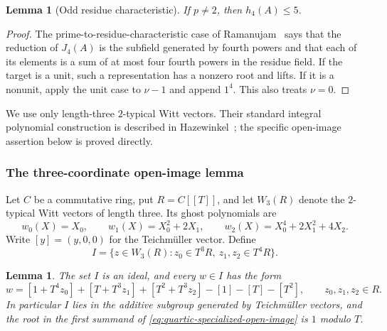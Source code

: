 \documentclass[11pt]{amsart}
\newtheorem{lemma}[theorem]{Lemma}
\theoremstyle{definition}
\numberwithin{equation}{section}
\begin{document}
\begin{lemma}[Odd residue characteristic]\label{lem:odd-local}
If $p\ne2$, then $h_4(A)\le5$.
\end{lemma}
\begin{proof}
The prime-to-residue-characteristic case of
Ramanujam~\cite[Lemma~1]{Ramanujam1963} says that the reduction of
$J_4(A)$ is the subfield generated by fourth powers and that each
of its elements is a sum of at most four fourth powers in the
residue field. If the target is a unit, such a representation has
a nonzero root and lifts. If it is a nonunit, apply the unit case
to $\nu-1$ and append $1^4$. This also treats $\nu=0$.
\end{proof}

We use only length-three $2$-typical Witt vectors. Their standard
integral polynomial construction is described in
Hazewinkel~\cite[Sections~5.2--5.22]{hazewinkel2009}; the specific
open-image assertion below is proved directly.
\subsubsection{The three-coordinate open-image lemma}

Let $C$ be a commutative ring, put $R=C[[T]]$, and let $W_3(R)$ denote
the $2$-typical Witt vectors of length three.  Its ghost polynomials are
\[
 w_0(X)=X_0,\qquad w_1(X)=X_0^2+2X_1,\qquad
 w_2(X)=X_0^4+2X_1^2+4X_2.
\]
Write $[y]=(y,0,0)$ for the Teichm\"uller vector.  Define
\[
 I=\{z\in W_3(R):z_0\in T^3R,\ z_1,z_2\in T^4R\}.
\]
\begin{lemma}\label{lem:wittopen}
The set $I$ is an ideal, and every $w\in I$ has the form
\begin{equation}\label{eq:quartic-specialized-open-image}
 w=[1+T^4z_0]+[T+T^3z_1]+[T^2+T^3z_2]
       -[1]-[T]-[T^2],\qquad z_0,z_1,z_2\in R.
\end{equation}
In particular $I$ lies in the additive subgroup generated by
Teichm\"uller vectors, and the root in the first summand of
\eqref{eq:quartic-specialized-open-image} is $1$ modulo $T$.
\end{lemma}
\end{document}
